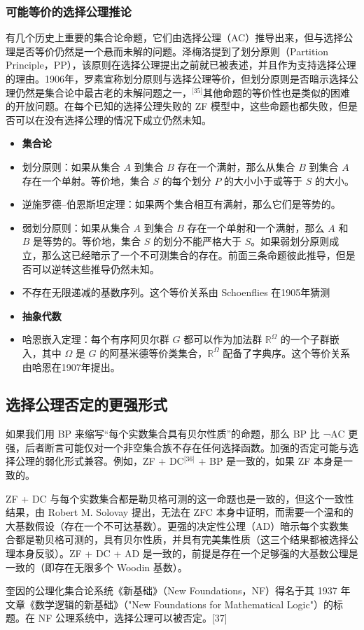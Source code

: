 \subsubsection{可能等价的选择公理推论}  
有几个历史上重要的集合论命题，它们由选择公理（AC）推导出来，但与选择公理是否等价仍然是一个悬而未解的问题。泽梅洛提到了划分原则（Partition Principle，PP），该原则在选择公理提出之前就已被表述，并且作为支持选择公理的理由。1906年，罗素宣称划分原则与选择公理等价，但划分原则是否暗示选择公理仍然是集合论中最古老的未解问题之一，\(^\text{[35]}\)其他命题的等价性也是类似的困难的开放问题。在每个已知的选择公理失败的 ZF 模型中，这些命题也都失败，但是否可以在没有选择公理的情况下成立仍然未知。
\begin{itemize}
\item \textbf{集合论}  
\item 划分原则：如果从集合 \(A\) 到集合 \(B\) 存在一个满射，那么从集合 \(B\) 到集合 \(A\) 存在一个单射。等价地，集合 \(S\) 的每个划分 \(P\) 的大小小于或等于 \(S\) 的大小。  
\item 逆施罗德–伯恩斯坦定理：如果两个集合相互有满射，那么它们是等势的。  
\item 弱划分原则：如果从集合 \(A\) 到集合 \(B\) 存在一个单射和一个满射，那么 \(A\) 和 \(B\) 是等势的。等价地，集合 \(S\) 的划分不能严格大于 \(S\)。如果弱划分原则成立，那么这已经暗示了一个不可测集合的存在。前面三条命题彼此推导，但是否可以逆转这些推导仍然未知。  
\item 不存在无限递减的基数序列。这个等价关系由 Schoenflies 在1905年猜测
\end{itemize}
\begin{itemize}
\item \textbf{抽象代数}  
\item 哈恩嵌入定理：每个有序阿贝尔群 \(G\) 都可以作为加法群 \(\mathbb{R}^\Omega\) 的一个子群嵌入，其中 \(\Omega\) 是 \(G\) 的阿基米德等价类集合，\(\mathbb{R}^\Omega\) 配备了字典序。这个等价关系由哈恩在1907年提出。
\end{itemize}
\subsection{选择公理否定的更强形式}  
如果我们用 BP 来缩写“每个实数集合具有贝尔性质”的命题，那么 BP 比 ¬AC 更强，后者断言可能仅对一个非空集合族不存在任何选择函数。加强的否定可能与选择公理的弱化形式兼容。例如，ZF + DC\(^\text{[36]}\) + BP 是一致的，如果 ZF 本身是一致的。

ZF + DC 与每个实数集合都是勒贝格可测的这一命题也是一致的，但这个一致性结果，由 Robert M. Solovay 提出，无法在 ZFC 本身中证明，而需要一个温和的大基数假设（存在一个不可达基数）。更强的决定性公理（AD）暗示每个实数集合都是勒贝格可测的，具有贝尔性质，并具有完美集性质（这三个结果都被选择公理本身反驳）。ZF + DC + AD 是一致的，前提是存在一个足够强的大基数公理是一致的（即存在无限多个 Woodin 基数）。

奎因的公理化集合论系统《新基础》（New Foundations，NF）得名于其 1937 年文章《数学逻辑的新基础》（"New Foundations for Mathematical Logic"）的标题。在 NF 公理系统中，选择公理可以被否定。[37]